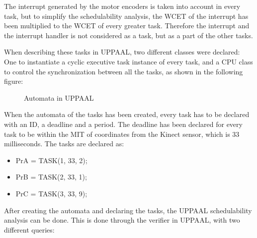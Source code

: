 The interrupt generated by the motor encoders is taken into account in every task, but to simplify the schedulability analysis, the WCET of the interrupt has been multiplied to the WCET of every greater task. Therefore the interrupt and the interrupt handler is not considered as a task, but as a part of the other tasks.

When describing these tasks in UPPAAL, two different classes were declared: One to instantiate a cyclic executive task instance of every task, and a CPU class to control the synchronization between all the tasks, as shown in the following figure:

\begin{figure}[h]
	\centering
	\caption{Automata in UPPAAL}
	\label{UppaalModelAutomata}
\end{figure}

When the automata of the tasks has been created, every task has to be declared with an ID, a deadline and a period. The deadline has been declared for every task to be within the MIT of coordinates from the Kinect sensor, which is 33 milliseconds.
The tasks are declared as:

\begin{itemize}
	\item PrA = TASK(1, 33, 2);
	\item PrB = TASK(2, 33, 1);
	\item PrC = TASK(3, 33, 9);
\end{itemize}

After creating the automata and declaring the tasks, the UPPAAL schedulability analysis can be done. This is done through the verifier in UPPAAL, with two different queries:

